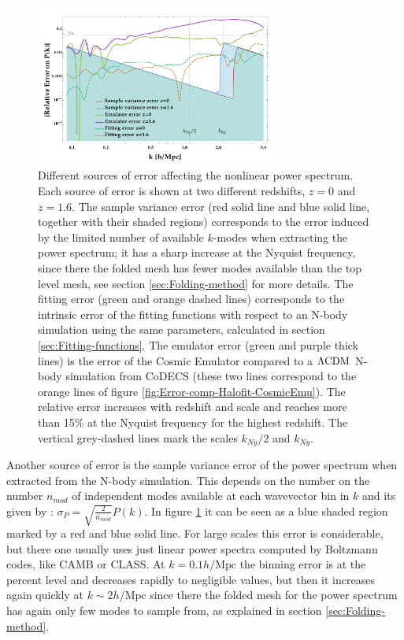 \begin{figure}
\includegraphics[width=0.7\textwidth]{Chapters/fitting-funcs/figures/allNbodyCosmicEmuFit-Errors-v8-Saveas}
\protect\caption[Sources of errors affecting the power spectrum from a CoDECS simulation.]{\label{fig:Error-sources}Different sources of error affecting the
nonlinear power spectrum. Each source of error is shown at two different
redshifts, $z=0$ and $z=1.6$. The sample variance error (red solid
line and blue solid line, together with their shaded regions) corresponds
to the error induced by the limited number of available $k$-modes
when extracting the power spectrum; it has a sharp increase at the
Nyquist frequency, since there the folded mesh has fewer modes available
than the top level mesh, see section \ref{sec:Folding-method} for
more details. The fitting error (green and orange dashed lines) corresponds
to the intrinsic error of the fitting functions with respect to an
N-body simulation using the same parameters, calculated in section
\ref{sec:Fitting-functions}. The emulator error (green and purple
thick lines) is the error of the Cosmic Emulator compared to a $\protect\Lambda\mathrm{CDM}$
N-body simulation from CoDECS (these two lines correspond to the orange
lines of figure \ref{fig:Error-comp-Halofit-CosmicEmu}). The relative
error increases with redshift and scale and reaches more than 15\%
at the Nyquist frequency for the highest redshift. The vertical grey-dashed
lines mark the scales $k_{Ny}/2$ and $k_{Ny}$. }
\end{figure}


Another source of error is the sample variance error of the power
spectrum when extracted from the N-body simulation. This depends on
the number on the number $n_{mod}$ of independent modes available
at each wavevector bin in $k$ and its given by \cite{feldman_power_1994}:
$\sigma_{P}=\sqrt{\frac{2}{n_{mod}}}P(k)$. In figure \ref{fig:Error-sources}
it can be seen as a blue shaded region marked by a red and blue solid
line. For large scales this error is considerable, but there one usually
uses just linear power spectra computed by Boltzmann codes, like CAMB
or CLASS. At $k=0.1h/\mbox{Mpc}$ the binning error is at the percent
level and decreases rapidly to negligible values, but then it increases
again quickly at $k\sim2h/\mbox{Mpc}$ since there the folded mesh
for the power spectrum has again only few modes to sample from, as
explained in section \ref{sec:Folding-method}.

